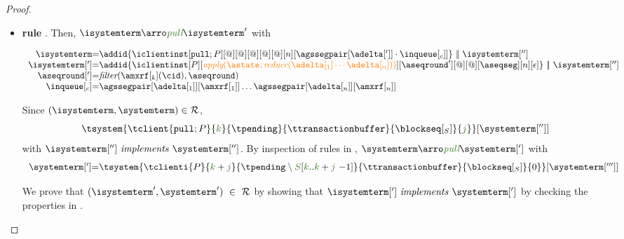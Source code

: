 \begin{proof}
\begin{itemize}
\begin{itemize}
							

					
	
	\item {\bf rule }. Then, $\isystemterm  \arroi{\pulltran} \isystemterm '$ with 
	
				\[\begin{array}{r@{=}l}
					\isystemterm & \addid{\iclientinst[\tpullins][@]
						[@]%
						[@][@][@][n][{\agssegpair[{\adelta[']}]}\cdot\inclient]}
								\ \bigpar \ \isystemterm['']
					\\
					\isystemterm['] & \addid{\iclientinst[P]
						 [\iapply{\known}{\ireduce{\adelta[_1]\cdots\adelta[_n]}}]
						 [\aseqround']
						 [@][@]
						 [{\receivebuffer}][n][\epsilon]}\ \bigpar \ \isystemterm['']	\\
					   \aseqround['] & \filter{\amxrf[_k](\cid)}{\aseqround} \\
						\inclient & \agssegpair[{\adelta[_1]}][{\amxrf[_1]}]\ldots \agssegpair[{\adelta[_n]}][{\amxrf[_n]}]
				  \end{array}
				\]
		
				Since $(\isystemterm,\systemterm)\in \mathcal{R}$,
				\[\tsystem{\tclient{\tpullins}{\tknown}{\tpending}{\ttransactionbuffer}{\tsent}{\treceivebuffer}}[{\systemterm['']}] \]
				with $\implements{\isystemterm['']}{\systemterm['']}$. By inspection of rules in \figref{}, 
				$\systemterm\arroi{\pulltran} \systemterm[']$ with
				\[\begin{array}{r@{=}l}
					\systemterm['] &  \tsystem{\tclienti{\tprogram}{\tknown+\treceivebuffer}{\tpending \setminus \queuemessage[\tknown .. \tknown + \treceivebuffer  {\ -1}]}{\ttransactionbuffer}{\tsent}{0}}[{\systemterm[''']}]	
				  \end{array}		
				\]
				
				We  prove that $(\isystemterm',\systemterm') \ \in \ \mathcal{R}$ by showing that $\implements{\isystemterm[']}{\systemterm[']}$ 
				by checking the properties in .	
				
					\begin{enumerate}
					

\end{enumerate}
\end{itemize}
\end{itemize}
\end{proof}
